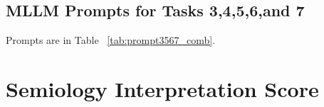 \documentclass{article}
\theoremstyle{plain}
\theoremstyle{definition}
\theoremstyle{remark}
\begin{document}
%

% 





\subsection{MLLM Prompts for Tasks 3,4,5,6,and 7}
\label{subsec:mllm_prompt_task3_supp}

Prompts are in Table ~\ref{tab:prompt3567_comb}.






%
%
%
%



\section{Semiology Interpretation Score}
\label{sec:sem_int_score_supp}
\end{document}
